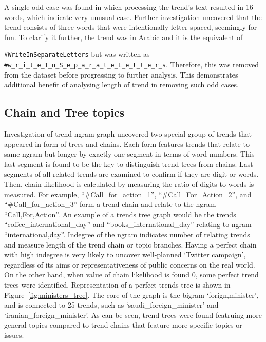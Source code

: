 \documentclass[conference]{IEEEtran}
\begin{document}
A single odd case was found in which processing the trend’s text
resulted in 16 words, which indicate very unusual case. Further
investigation uncovered that the trend consists of three words that
were intentionally letter spaced, seemingly for fun. To clarify it
further, the trend was in Arabic and it is the equivalent of
{\texttt{\#WriteInSeparateLetters} but was written as
{\footnotesize{{\texttt{\#w\_r\_i\_t\_e\_I\_n\_S\_e\_p\_a\_r\_a\_t\_e\_L\_e\_t\_t\_e\_r\_s}}}}.
Therefore, this was removed from the dataset before progressing to
further analysis. This demonstrates additional benefit of analysing
length of trend in removing such odd cases.

\subsection{Chain and Tree topics}

Investigation of trend-ngram graph uncovered two special group of trends 
that appeared in form of trees and chains. 
Each form features trends that relate to same ngram but longer by exactly 
one segment in terms of word numbers. This last segment is found to be 
the key to distinguish trend trees from chains. Last segments of all related 
trends are examined to confirm if they are digit or words. Then, chain 
likelihood is calculated by measuring the ratio of digits to words is measured. 
For example, “\#Call\_for\_action\_1”, “\#Call\_For\_Action\_2”, and 
“\#Call\_for\_action\_3” 
form a trend chain and relate to the ngram “Call,For,Action”. An example 
of a trends tree graph would be the trends “coffee\_international\_day” and 
“books\_international\_day” relating to ngram “international,day”. Indegree of 
the ngram indicates number of relating trends and measure length of the 
trend chain or topic branches. Having a perfect chain with high indegree 
is very likely to uncover well-planned ‘Twitter campaign’, regardless 
of its aims or representativeness of public concerns on the real world. 
On the other hand, when value of chain 
likelihood is found 0, some perfect trend trees were identified. 
Representation of a perfect trends tree is shown in Figure~\ref{fig:ministers_tree}. 
The core of the graph is the bigram ‘forign,minister’, and is connected to 25 
trends, such as ‘saudi\_foreign\_minister’ and ‘iranian\_foreign\_minister’. As can be seen, 
trend trees were found featruing more general topics compared to trend 
chains that feature more specific topics or issues.

}
\end{document}
